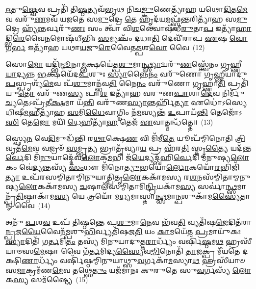 \-\ul{𑌋}\-𑌤𑍁\-\ul{𑌷𑍍𑌵𑍇}\-𑌵 𑌪𑍍𑌰𑌤𑌿᳴ 𑌤𑌿\-\ul{𑌷𑍍𑌠}\-𑌤𑍍𑌯𑌵᳴𑌭𑍃𑌥 𑌨𑌿𑌚\-\ul{𑌙𑍍𑌕𑍁}\-𑌣𑍇𑌤𑍍𑌯𑌾᳴𑌹 𑌯𑌥𑍋\-\ul{𑌦𑌿}\-𑌤\-\ul{𑌮𑍇}\-𑌵 𑌵𑌰𑍁᳴\-\ul{𑌣}\-𑌮𑌵᳴ 𑌯𑌜𑌤𑍇 𑌸\-\ul{𑌮𑍁}\-𑌦𑍍𑌰𑍇 \ul{𑌤𑍇} 𑌹𑍃𑌦᳴𑌯\-\ul{𑌮}\-𑌫𑍍𑌸𑍍𑌵᳴𑌨𑍍𑌤𑌰𑌿𑌤𑍍𑌯𑌾᳴𑌹 𑌸\-\ul{𑌮𑍁}\-𑌦𑍍𑌰𑍇 𑌹𑍍𑌯᳴𑌨𑍍𑌤𑌰𑍍𑌵𑌰𑍁᳴\-\ul{𑌣𑌃} 𑌸𑌂 𑌤𑍍𑌵𑌾᳴ 𑌵𑌿\-\ul{𑌶}\-𑌨𑍍𑌤𑍍𑌵𑍋𑌷᳴𑌧𑍀\-\ul{𑌰𑍁}\-𑌤𑌾\-\ul{𑌪} 𑌇𑌤𑍍𑌯𑌾᳴\-\ul{𑌹𑌾}\-𑌦𑍍𑌭𑌿\-\ul{𑌰𑍇}\-𑌵𑍈\-\ul{𑌨}\-𑌮𑍋𑌷᳴𑌧𑍀𑌭𑌿𑌃 \ul{𑌸}\-𑌮𑍍𑌯𑌞𑍍𑌚𑌂᳴ 𑌦𑌧𑌾\-\ul{𑌤𑌿} 𑌦𑍇𑌵𑍀᳴𑌰𑌾𑌪 \ul{𑌏}\-𑌷 \ul{𑌵𑍋} 𑌗\-\ul{𑌰𑍍𑌭} 𑌇𑌤𑍍𑌯𑌾᳴𑌹 𑌯𑌥𑌾\-\ul{𑌯}\-𑌜𑍁\-\ul{𑌰𑍇}\-𑌵𑍈𑌤\-\ul{𑌤𑍍𑌪}\-𑌶\-\ul{𑌵𑍋} 𑌵𑍈~(12)

𑌸𑍋\-\ul{𑌮𑍋} 𑌯𑌦𑍍𑌭𑌿᳴\-\ul{𑌨𑍍𑌦𑍂}\-𑌨𑌾\-\ul{𑌮𑍍𑌭}\-𑌕𑍍𑌷𑌯𑍇॑𑌤𑍍𑌪\-\ul{𑌶𑍁}\-𑌮𑌾\-\ul{𑌨𑍍𑌥𑍍𑌸𑍍𑌯𑌾}\-𑌦𑍍𑌵𑌰𑍁᳴\-\ul{𑌣}\-𑌸𑍍𑌤𑍍𑌵𑍇᳴𑌨𑌂 𑌗𑍃𑌹𑍍𑌣𑍀\-\ul{𑌯𑌾}\-𑌦𑍍𑌯𑌨𑍍𑌨 \ul{𑌭}\-𑌕𑍍𑌷𑌯𑍇᳴𑌦\-\ul{𑌪}\-𑌶𑍁𑌃 \ul{𑌸𑍍𑌯𑌾}\-𑌨𑍍𑌨𑍈\-\ul{𑌨𑌂} 𑌵𑌰𑍁᳴𑌣𑍋 𑌗𑍃𑌹𑍍𑌣𑍀𑌯𑌾𑌦𑍁\-\ul{𑌪}\-𑌸𑍍𑌪𑍃𑌶𑍍𑌯᳴\-\ul{𑌮𑍇}\-𑌵 𑌪᳴\-\ul{𑌶𑍁}\-𑌮𑌾𑌨𑍍𑌭᳴𑌵\-\ul{𑌤𑌿} 𑌨𑍈\-\ul{𑌨𑌂} 𑌵𑌰𑍁᳴𑌣𑍋 𑌗𑍃𑌹𑍍𑌣𑌾\-\ul{𑌤𑌿} 𑌪𑍍𑌰𑌤𑌿᳴𑌯𑍁\-\ul{𑌤𑍋} 𑌵𑌰𑍁᳴𑌣\-\ul{𑌸𑍍𑌯} 𑌪𑌾\-\ul{𑌶} 𑌇𑌤𑍍𑌯𑌾᳴𑌹 𑌵𑌰𑍁𑌣\-\ul{𑌪𑌾}\-𑌶𑌾\-\ul{𑌦𑍇}\-𑌵 𑌨𑌿𑌰𑍍𑌮𑍁᳴\-\ul{𑌚𑍍𑌯}\-𑌤𑍇\-𑌽𑌪𑍍𑌰᳴𑌤𑍀\-\ul{𑌕𑍍𑌷}\-𑌮𑌾 𑌯᳴\-\ul{𑌨𑍍𑌤𑌿} 𑌵𑌰𑍁᳴𑌣\-\ul{𑌸𑍍𑌯𑌾}\-𑌨𑍍𑌤𑌰𑍍\mbox{}𑌹𑌿᳴\-\ul{𑌤𑍍𑌯𑌾} 𑌏𑌧𑍋॑\-𑌽𑌸𑍍𑌯𑍇𑌧𑌿𑌷𑍀\-\ul{𑌮}\-𑌹𑍀𑌤𑍍𑌯𑌾᳴𑌹 \ul{𑌸}\-𑌮𑌿\-\ul{𑌧𑍈}\-𑌵𑌾𑌗𑍍𑌨𑌿𑌂 𑌨᳴\-\ul{𑌮}\-𑌸𑍍𑌯𑌨𑍍𑌤᳴ \ul{𑌉}\-𑌪𑌾𑌯᳴\-\ul{𑌨𑍍𑌤𑌿} 𑌤𑍇𑌜𑍋᳴\-𑌽\-\ul{𑌸𑌿} 𑌤𑍇\-\ul{𑌜𑍋} 𑌮𑌯𑌿᳴ \ul{𑌧𑍇}\-𑌹𑍀𑌤𑍍𑌯𑌾᳴\-\ul{𑌹} 𑌤𑍇𑌜᳴ \ul{𑌏}\-𑌵𑌾𑌤𑍍𑌮𑌨𑍍𑌧᳴𑌤𑍍𑌤𑍇॥~(13)

{\anuvakamend[{𑌰𑌕𑍍𑌷𑌾𑍞᳴𑌸𑌿 𑌪𑍍𑌰\-\ul{𑌯𑌾}\-𑌜𑌾\-\ul{𑌨𑍃}\-𑌤\-\ul{𑌵𑍋} 𑌵𑍈 𑌨᳴\-\ul{𑌮}\-𑌸𑍍𑌯\-\ul{𑌨𑍍𑌤𑍋} 𑌦𑍍𑌵𑌾𑌦᳴𑌶 𑌚}]}%

𑌸𑍍𑌫𑍍𑌯𑍇\-\ul{𑌨} 𑌵𑍇\-\ul{𑌦𑌿}\-𑌮𑍁𑌦𑍍𑌧᳴𑌨𑍍𑌤𑌿 𑌰\-\ul{𑌥𑌾}\-𑌕𑍍𑌷𑍇\-\ul{𑌣} 𑌵𑌿 𑌮𑌿᳴𑌮𑍀\-\ul{𑌤𑍇} 𑌯𑍂𑌪᳴𑌮𑍍𑌮𑌿𑌨𑍋𑌤𑌿 \ul{𑌤𑍍𑌰𑌿}\-𑌵𑍃𑌤᳴\-\ul{𑌮𑍇}\-𑌵 𑌵𑌜𑍍𑌰𑍞᳴ \ul{𑌸}\-𑌮𑍍𑌭𑍃\-\ul{𑌤𑍍𑌯} 𑌭𑍍𑌰𑌾𑌤𑍃᳴𑌵𑍍𑌯𑌾\-\ul{𑌯} 𑌪𑍍𑌰 𑌹᳴𑌰\-\ul{𑌤𑌿} 𑌸𑍍𑌤𑍃\-\ul{𑌤𑍍𑌯𑍈} 𑌯𑌦᳴𑌨𑍍𑌤\-\ul{𑌰𑍍𑌵𑍇}\-𑌦𑌿 𑌮𑌿᳴\-\ul{𑌨𑍁}\-𑌯𑌾𑌦𑍍𑌦𑍇᳴𑌵\-\ul{𑌲𑍋}\-𑌕\-\ul{𑌮}\-𑌭𑌿 𑌜᳴\-\ul{𑌯𑍇}\-𑌦𑍍𑌯𑌦𑍍𑌬᳴𑌹𑌿\-\ul{𑌰𑍍𑌵𑍇}\-𑌦𑌿 𑌮᳴𑌨𑍁𑌷𑍍𑌯\-\ul{𑌲𑍋}\-𑌕𑌂 𑌵𑍇॑\-\ul{𑌦𑍍𑌯}\-𑌨𑍍𑌤𑌸𑍍𑌯᳴ \ul{𑌸𑌂}\-𑌧𑍗 𑌮𑌿᳴𑌨𑍋\-\ul{𑌤𑍍𑌯𑍁}\-𑌭𑌯𑍋॑\-\ul{𑌰𑍍𑌲𑍋}\-𑌕𑌯𑍋᳴\-\ul{𑌰}\-𑌭𑌿𑌜𑌿᳴\-\ul{𑌤𑍍𑌯𑌾} 𑌉𑌪᳴𑌰𑌸𑌮𑍍𑌮𑌿𑌤𑌾𑌮𑍍𑌮𑌿𑌨𑍁𑌯𑌾𑌤𑍍𑌪𑌿𑌤𑍃\-\ul{𑌲𑍋}\-𑌕𑌕𑌾᳴𑌮𑌸𑍍𑌯 𑌰\-\ul{𑌶}\-𑌨𑌸᳴𑌮𑍍𑌮𑌿𑌤𑌾𑌮𑍍𑌮𑌨𑍁𑌷𑍍𑌯\-\ul{𑌲𑍋}\-𑌕𑌕𑌾᳴𑌮𑌸𑍍𑌯 \ul{𑌚}\-𑌷𑌾𑌲᳴𑌸𑌮𑍍𑌮𑌿𑌤𑌾𑌮𑌿\-\ul{𑌨𑍍𑌦𑍍𑌰𑌿}\-𑌯𑌕𑌾᳴𑌮\-\ul{𑌸𑍍𑌯} 𑌸𑌰𑍍𑌵𑌾॑\-\ul{𑌨𑍍𑌥𑍍𑌸}\-𑌮𑌾𑌨𑍍𑌪𑍍𑌰᳴\-\ul{𑌤𑌿}\-𑌷𑍍𑌠𑌾𑌕𑌾᳴𑌮\-\ul{𑌸𑍍𑌯} 𑌯𑍇 𑌤𑍍𑌰𑌯𑍋᳴ 𑌮\-\ul{𑌧𑍍𑌯}\-𑌮𑌾𑌸𑍍𑌤𑌾\-\ul{𑌨𑍍𑌥𑍍𑌸}\-𑌮𑌾\-\ul{𑌨𑍍𑌪}\-𑌶𑍁𑌕𑌾᳴𑌮\-\ul{𑌸𑍍𑌯𑍈}\-𑌤𑌾𑌨𑍍 𑌵𑍈~(14)

𑌅𑌨𑍁᳴ \ul{𑌪}\-𑌶\-\ul{𑌵} 𑌉𑌪᳴ 𑌤𑌿𑌷𑍍𑌠𑌨𑍍𑌤𑍇 𑌪\-\ul{𑌶𑍁}\-𑌮𑌾\-\ul{𑌨𑍇}\-𑌵 𑌭᳴𑌵\-\ul{𑌤𑌿} 𑌵𑍍𑌯𑌤𑌿᳴𑌷\-\ul{𑌜𑍇}\-𑌦𑌿𑌤᳴𑌰𑌾\-\ul{𑌨𑍍𑌪𑍍𑌰}\-𑌜\-\ul{𑌯𑍈}\-𑌵𑍈𑌨᳴\-\ul{𑌮𑍍𑌪}\-𑌶𑍁\-\ul{𑌭𑌿}\-𑌰𑍍𑌵𑍍𑌯𑌤𑌿᳴𑌷𑌜\-\ul{𑌤𑌿} 𑌯𑌂 \ul{𑌕𑌾}\-𑌮𑌯𑍇᳴𑌤 \ul{𑌪𑍍𑌰}\-𑌮𑌾𑌯𑍁᳴𑌕𑌃 \ul{𑌸𑍍𑌯𑌾}\-𑌦𑌿𑌤𑌿᳴ 𑌗\-\ul{𑌰𑍍𑌤}\-𑌮𑌿\-\ul{𑌤𑌂} 𑌤𑌸𑍍𑌯᳴ 𑌮𑌿𑌨𑍁𑌯𑌾𑌦𑍁𑌤𑍍𑌤\-\ul{𑌰𑌾}\-𑌰𑍍𑌧𑍍𑌯𑌂᳴ 𑌵𑌰𑍍\mbox{}𑌷𑌿᳴\-\ul{𑌷𑍍𑌠}\-𑌮\-\ul{𑌥} 𑌹𑍍𑌰𑌸𑍀᳴𑌯𑌾𑍞𑌸\-\ul{𑌮𑍇}\-𑌷𑌾 𑌵𑍈 𑌗᳴\-\ul{𑌰𑍍𑌤}\-𑌮𑌿𑌦𑍍𑌯\-\ul{𑌸𑍍𑌯𑍈}\-𑌵\-\ul{𑌮𑍍𑌮𑌿}\-𑌨𑍋𑌤𑌿᳴ \ul{𑌤𑌾}\-𑌜𑌕𑍍𑌪𑍍𑌰 𑌮𑍀᳴𑌯𑌤𑍇 𑌦𑌕𑍍𑌷𑌿\-\ul{𑌣𑌾}\-𑌰𑍍𑌧𑍍𑌯𑌂᳴ 𑌵𑌰𑍍\mbox{}𑌷𑌿᳴𑌷𑍍𑌠𑌮𑍍𑌮𑌿𑌨𑍁𑌯𑌾𑌥𑍍𑌸𑍁\-\ul{𑌵}\-𑌰𑍍𑌗𑌕𑌾᳴\-\ul{𑌮}\-𑌸𑍍𑌯𑌾\-\ul{𑌥} 𑌹𑍍𑌰𑌸𑍀᳴𑌯𑌾𑍞𑌸\-\ul{𑌮𑌾}\-𑌕𑍍𑌰𑌮᳴𑌣\-\ul{𑌮𑍇}\-𑌵 𑌤𑌥𑍍𑌸𑍇\-\ul{𑌤𑍁𑌂} 𑌯𑌜᳴𑌮𑌾𑌨𑌃 𑌕𑍁𑌰𑍁𑌤𑍇 𑌸𑍁\-\ul{𑌵}\-𑌰𑍍𑌗𑌸𑍍𑌯᳴ \ul{𑌲𑍋}\-𑌕\-\ul{𑌸𑍍𑌯} 𑌸𑌮᳴𑌷𑍍𑌟𑍍𑌯𑍈~(15)

